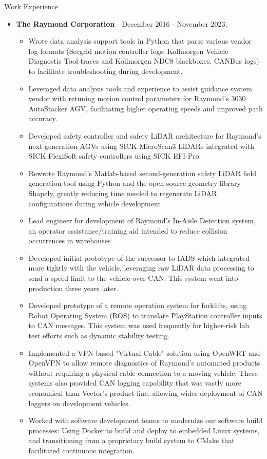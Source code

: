 \documentclass[10pt,oneside]{article}
\newenvironment{ressection}[1]{
	\vspace{4pt}
	{\Large#1}
	\begin{itemize}
	\vspace{3pt}
}{
	\end{itemize}
}
\newcommand{\ressubitem}[1]{
	\vspace{-1pt}
	\item \begin{flushleft} #1 \end{flushleft}
}
\newcommand{\resbigitem}[3]{
	\vspace{-5pt}
	\item
	\textbf{#1}---#2; \quad \textit{#3}
}
\newenvironment{ressubsec}[3]{
	\resbigitem{#1}{#2}{#3}
	\vspace{-2pt}
	\begin{itemize}
}{
	\end{itemize}
}
\newenvironment{ressection}[1]{
	\vspace{4pt}
	{\fontfamily{phv}\selectfont\Large#1}
	\begin{itemize}[leftmargin=12pt]
	\vspace{3pt}
}{
	\end{itemize}
}
\newcommand{\ressubitem}[1]{
	\vspace{-1pt}
	\item \begin{flushleft} #1 \end{flushleft}
}
\newcommand{\resbigitem}[2]{
	\vspace{-5pt}
	\item
	\textbf{#1}---\textit{#2}
}
\newenvironment{ressubsec}[2]{
	\resbigitem{#1}{#2}
	\vspace{-2pt}
	\begin{itemize}[leftmargin=12pt]
	}{
	\end{itemize}
	\vfil\penalty-50\vfilneg
}
\begin{document}
\begin{ressection}{Work Experience}

	\begin{ressubsec}{The Raymond Corporation}{December 2016 - November 2023}
		\ressubitem{Primary maintainer of obstruction detection subsystem for Raymond Courier AGVs - configuration of SICK FlexiSoft safety controller logic and SICK S300 safety LiDAR configuration}
		\ressubitem{Wrote data analysis support tools in Python that parse various vendor log formats (Seegrid motion controller logs, Kollmorgen Vehicle Diagnostic Tool traces and Kollmorgen NDC8 blackboxes, CANBus logs) to facilitate troubleshooting during development.}
		\ressubitem{Leveraged data analysis tools and experience to assist guidance system vendor with retuning motion control parameters for Raymond's 3030 AutoStacker AGV, facilitating higher operating speeds and improved path accuracy.}
		\ressubitem{Developed safety controller and safety LiDAR architecture for Raymond's next-generation AGVs using SICK MicroScan3 LiDARs integrated with SICK FlexiSoft safety controllers using SICK EFI-Pro}
		\ressubitem{Rewrote Raymond's Matlab-based second-generation safety LiDAR field generation tool using Python and the open source geometry library Shapely, greatly reducing time needed to regenerate LiDAR configurations during vehicle development}
		\ressubitem{Lead engineer for development of Raymond's In-Aisle Detection system, an operator assistance/training aid intended to reduce collision occurrences in warehouses}
		\ressubitem{Developed initial prototype of the successor to IADS which integrated more tightly with the vehicle, leveraging raw LiDAR data processing to send a speed limit to the vehicle over CAN.  This system went into production three years later.}
		\ressubitem{Developed prototype of a remote operation system for forklifts, using Robot Operating System (ROS) to translate PlayStation controller inputs to CAN messages.  This system was used frequently for higher-risk lab test efforts such as dynamic stability testing.}
		\ressubitem{Implemented a VPN-based "Virtual Cable" solution using OpenWRT and OpenVPN to allow remote diagnostics of Raymond's automated products without requiring a physical cable connection to a moving vehicle.  These systems also provided CAN logging capability that was vastly more economical than Vector's product line, allowing wider deployment of CAN loggers on development vehicles.}
		\ressubitem{Worked with software development teams to modernize our software build processes:  Using Docker to build and deploy to embedded Linux systems, and transitioning from a proprietary build system to CMake that facilitated continuous integration. }
	\end{ressubsec}


\end{ressection}
\end{document}
